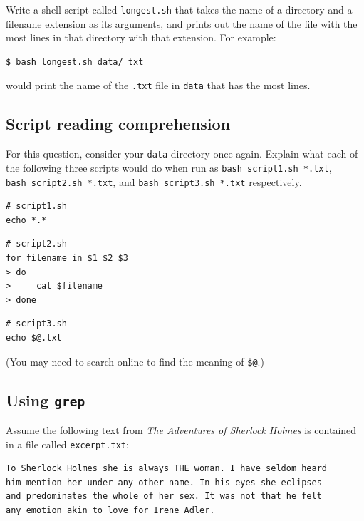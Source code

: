 \documentclass[
]{krantz}
\begin{document}
Write a shell script called \texttt{longest.sh} that takes the name of a
directory and a filename extension as its arguments, and prints
out the name of the file with the most lines in that directory
with that extension. For example:

\begin{verbatim}
$ bash longest.sh data/ txt
\end{verbatim}

would print the name of the \texttt{.txt} file in \texttt{data} that has
the most lines.

\hypertarget{bash-advanced-ex-reading-scripts}{%
\subsection{Script reading comprehension}\label{bash-advanced-ex-reading-scripts}}

For this question, consider your \texttt{data} directory once again.
Explain what each of the following three scripts would do when run as
\texttt{bash\ script1.sh\ *.txt}, \texttt{bash\ script2.sh\ *.txt}, and \texttt{bash\ script3.sh\ *.txt} respectively.

\begin{verbatim}
# script1.sh
echo *.*
\end{verbatim}

\begin{verbatim}
# script2.sh
for filename in $1 $2 $3
> do
>     cat $filename
> done
\end{verbatim}

\begin{verbatim}
# script3.sh
echo $@.txt
\end{verbatim}

(You may need to search online to find the meaning of \texttt{\$@}.)

\hypertarget{bash-advanced-ex-using-grep}{%
\subsection{\texorpdfstring{Using \texttt{grep}}{Using grep}}\label{bash-advanced-ex-using-grep}}

Assume the following text from \emph{The Adventures of Sherlock Holmes}
is contained in a file called \texttt{excerpt.txt}:

\begin{verbatim}
To Sherlock Holmes she is always THE woman. I have seldom heard
him mention her under any other name. In his eyes she eclipses
and predominates the whole of her sex. It was not that he felt
any emotion akin to love for Irene Adler.
\end{verbatim}
\end{document}

